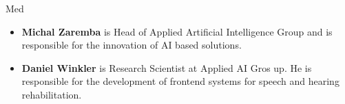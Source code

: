 \begin{sitedescription}{Med}
\begin{itemize} %

\item{\bf Michal Zaremba} is Head of Applied Artificial Intelligence Group and is responsible for the innovation of AI based solutions.

\item{\bf Daniel Winkler} is Research Scientist at Applied AI Gros
  up. He is responsible for the development of frontend systems for speech and hearing rehabilitation.
    
\end{itemize}

\end{sitedescription}

